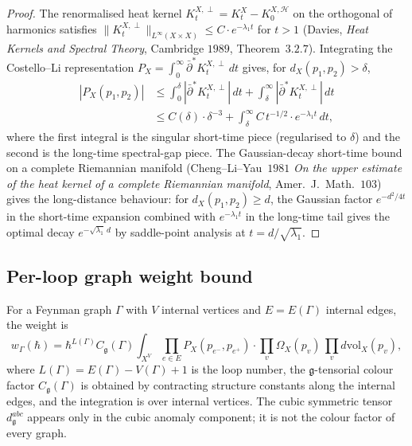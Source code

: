 \documentclass[11pt]{article}
\providecommand{\frakg}{\mathfrak{g}}
\providecommand{\dbar}{\bar{\partial}}
\theoremstyle{definition}\newtheorem{definition}[theorem]{Definition}
\theoremstyle{remark}\newtheorem{remark}[theorem]{Remark}\newtheorem{example}[theorem]{Example}
\begin{document}
\begin{proof}
The renormalised heat kernel $K_t^{X,\perp} = K_t^X - K_0^{X,\mathcal H}$
on the orthogonal of harmonics satisfies
$\|K_t^{X,\perp}\|_{L^\infty(X\times X)} \leq C\cdot e^{-\lambda_1 t}$ for
$t > 1$ (Davies, \emph{Heat Kernels and Spectral Theory}, Cambridge
$1989$, Theorem~$3.2.7$). Integrating the Costello--Li representation
$P_X = \int_0^\infty\dbar^*K_t^{X,\perp}\,dt$ gives, for
$d_X(p_1,p_2) > \delta$,
\begin{align*}
|P_X(p_1,p_2)| &\leq \int_0^\delta|\dbar^* K_t^{X,\perp}|\,dt + \int_\delta^\infty|\dbar^* K_t^{X,\perp}|\,dt\\
&\leq C(\delta)\cdot \delta^{-3} + \int_\delta^\infty C\,t^{-1/2}\cdot e^{-\lambda_1 t}\,dt,
\end{align*}
where the first integral is the singular short-time piece (regularised
to $\delta$) and the second is the long-time spectral-gap piece. The
Gaussian-decay short-time bound on a complete Riemannian manifold
(Cheng--Li--Yau~$1981$ \emph{On the upper estimate of the heat kernel
of a complete Riemannian manifold}, Amer.~J.~Math.~$103$) gives the
long-distance behaviour: for $d_X(p_1,p_2)\geq d$, the Gaussian factor
$e^{-d^2/4t}$ in the short-time expansion combined with
$e^{-\lambda_1 t}$ in the long-time tail gives the optimal decay
$e^{-\sqrt{\lambda_1}\,d}$ by saddle-point analysis at $t = d/\sqrt{\lambda_1}$.
\end{proof}

\subsection{Per-loop graph weight bound}

For a Feynman graph $\Gamma$ with $V$ internal vertices and $E = E(\Gamma)$
internal edges, the weight is
\begin{equation}
\label{eq:graph-weight}
w_\Gamma(\hbar)
= \hbar^{L(\Gamma)} C_\frakg(\Gamma)\int_{X^V}
\prod_{e\in E}P_X(p_{e^-},p_{e^+})\cdot
\prod_{v}\Omega_X(p_v)\,\prod_{v}d\mathrm{vol}_X(p_v),
\end{equation}
where $L(\Gamma) = E(\Gamma) - V(\Gamma) + 1$ is the loop number, the
$\frakg$-tensorial colour factor $C_\frakg(\Gamma)$ is obtained by
contracting structure constants along the internal edges, and the
integration is over internal vertices. The cubic symmetric tensor
$d^{abc}_\frakg$ appears only in the cubic anomaly component; it is not
the colour factor of every graph.
\end{document}

